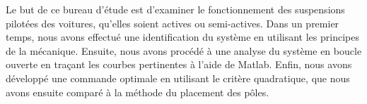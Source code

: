 \documentclass[a4paper,12pt]{insa} %
\begin{document}
\dosecttoc{}	  %
\pagestyle{fancy} %

\maketitle        %
\makecoverpage    %
\entete           %
\pieddepage       %

\tableofcontents

\clearpage

Le but de ce bureau d'étude est d'examiner le fonctionnement des suspensions pilotées des voitures, qu'elles soient actives ou semi-actives. Dans un premier temps, nous avons effectué une identification du système en utilisant les principes de la mécanique. Ensuite, nous avons procédé à une analyse du système en boucle ouverte en traçant les courbes pertinentes à l'aide de Matlab. Enfin, nous avons développé une commande optimale en utilisant le critère quadratique, que nous avons ensuite comparé à la méthode du placement des pôles.

\clearpage
\end{document}
